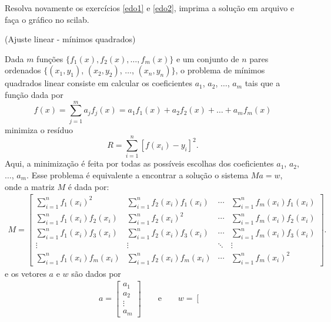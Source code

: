 \begin{exer}
Resolva novamente os exercícios \ref{edo1} e \ref{edo2}, imprima a solução em arquivo e faça o gráfico no scilab.
\end{exer}

\begin{exer}(Ajuste linear - mínimos quadrados)

Dada $m$ funções $\{f_1(x), f_2(x), \dotsc, f_m(x)\}$ e um conjunto de $n$ pares ordenados $\{(x_1, y_1)$, $(x_2, y_2)$, $\ldots$, $(x_n, y_n)\}$, o problema de mínimos quadrados linear consiste em calcular os coeficientes $a_1$, $a_2$, $\ldots$, $a_m$ tais que a função dada por
\begin{equation}
  f(x) = \sum_{j=1}^m a_jf_j(x) = a_1f_1(x)+a_2f_2(x)+\ldots+a_mf_m(x)
\end{equation}
minimiza o resíduo
\begin{equation}
  R= \sum_{i=1}^n \left[f(x_i)-y_i\right]^2.
\end{equation}
Aqui, a minimização é feita por todas as possíveis escolhas dos coeficientes $a_1$, $a_2$, $\ldots$, $a_m$. Esse problema é equivalente a encontrar a solução o sistema $Ma=w$, onde a matriz $M$ é dada por:
\begin{eqnarray*}
M = \begin{bmatrix}
\sum\limits_{i=1}^n f_1(x_i)^2 & \sum\limits_{i=1}^n f_2(x_i) f_1(x_i) & \!\cdots\! & \sum\limits_{i=1}^n f_m(x_i) f_1(x_i)\\
\sum\limits_{i=1}^n f_1(x_i) f_2(x_i)&\sum\limits_{i=1}^n f_2(x_i)^2 & \!\cdots\! & \sum\limits_{i=1}^n f_m(x_i)  f_2(x_i)\\
\sum\limits_{i=1}^n f_1(x_i) f_3(x_i)&\sum\limits_{i=1}^n f_2(x_i)f_3(x_i) & \!\cdots\! & \sum\limits_{i=1}^n f_m(x_i)  f_3(x_i)\\
\vdots & \vdots & \ddots & \vdots\\
\sum\limits_{i=1}^n f_1(x_i) f_m(x_i)&\sum\limits_{i=1}^n f_2(x_i)f_m(x_i) & \!\cdots\! & \sum\limits_{i=1}^n f_m(x_i)^2
\end{bmatrix}.
\end{eqnarray*}
e os vetores $a$ e $w$ são dados por
\begin{eqnarray*}
a=\left[
\begin{array}{c}
a_1\\
a_2\\
\vdots\\
a_m
\end{array}
\right]\qquad\text{e}\qquad w=\left[\begin{array}{c}

\end{array}
\end{eqnarray*}
\end{exer}
